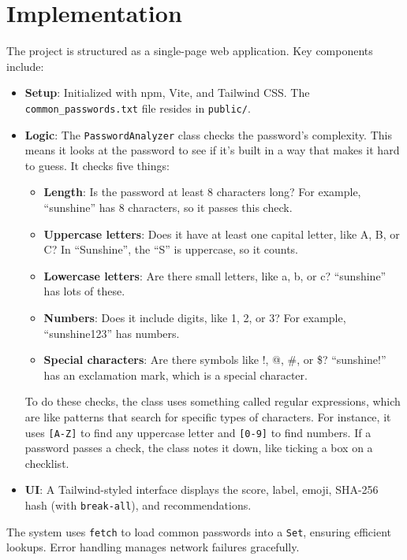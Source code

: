 \documentclass[11pt,a4paper]{report}
\begin{document}
\section{Implementation}
The project is structured as a single-page web application. Key components include:
\begin{itemize}
    \item \textbf{Setup}: Initialized with npm, Vite, and Tailwind CSS. The \texttt{common\_passwords.txt} file resides in \texttt{public/}.
    \item \textbf{Logic}: The \texttt{PasswordAnalyzer} class checks the password’s complexity. This means it looks at the password to see if it’s built in a way that makes it hard to guess. It checks five things:
    \begin{itemize}
        \item \textbf{Length}: Is the password at least 8 characters long? For example, “sunshine” has 8 characters, so it passes this check.
        \item \textbf{Uppercase letters}: Does it have at least one capital letter, like A, B, or C? In “Sunshine”, the “S” is uppercase, so it counts.
        \item \textbf{Lowercase letters}: Are there small letters, like a, b, or c? “sunshine” has lots of these.
        \item \textbf{Numbers}: Does it include digits, like 1, 2, or 3? For example, “sunshine123” has numbers.
        \item \textbf{Special characters}: Are there symbols like !, @, \#, or \$? “sunshine!” has an exclamation mark, which is a special character.
    \end{itemize}
    To do these checks, the class uses something called regular expressions, which are like patterns that search for specific types of characters. For instance, it uses \texttt{[A-Z]} to find any uppercase letter and \texttt{[0-9]} to find numbers. If a password passes a check, the class notes it down, like ticking a box on a checklist.
    \item \textbf{UI}: A Tailwind-styled interface displays the score, label, emoji, SHA-256 hash (with \texttt{break-all}), and recommendations.
\end{itemize}
The system uses \texttt{fetch} to load common passwords into a \texttt{Set}, ensuring efficient lookups. Error handling manages network failures gracefully.
\end{document}
